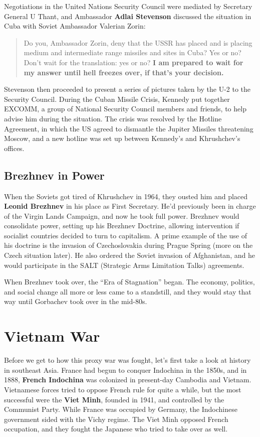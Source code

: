 Negotiations in the United Nations Security Council were mediated by Secretary General U Thant,
and Ambassador \textbf{Adlai Stevenson} discussed the situation in Cuba with Soviet Ambassador Valerian Zorin:
\begin{quote}
  Do you, Ambassador Zorin, deny that the USSR has placed
  and is placing medium and intermediate range missiles and sites in Cuba?
  Yes or no?
  Don't wait for the translation: yes or no?
  \textbf{I am prepared to wait for my answer until hell freezes over, if that's your decision.}
\end{quote}
Stevenson then proceeded to present a series of pictures taken by the U-2 to the Security Council.
During the Cuban Missile Crisis, Kennedy put together EXCOMM,
a group of National Security Council members and friends, to help advise him during the situation.
The crisis was resolved by the Hotline Agreement,
in which the US agreed to dismantle the Jupiter Missiles threatening Moscow,
and a new hotline was set up between Kennedy's and Khrushchev's offices.

\subsection*{Brezhnev in Power}

When the Soviets got tired of Khrushchev in 1964,
they ousted him and placed \textbf{Leonid Brezhnev} in his place as First Secretary.
He'd previously been in charge of the Virgin Lands Campaign, and now he took full power.
Brezhnev would consolidate power, setting up his Brezhnev Doctrine,
allowing intervention if socialist countries decided to turn to capitalism.
A prime example of the use of his doctrine is the invasion of Czechoslovakia during Prague Spring
(more on the Czech situation later).
He also ordered the Soviet invasion of Afghanistan,
and he would participate in the SALT (Strategic Arms Limitation Talks) agreements.

When Brezhnev took over, the ``Era of Stagnation'' began.
The economy, politics, and social change all more or less came to a standstill,
and they would stay that way until Gorbachev took over in the mid-80s.

\section{Vietnam War}

Before we get to how this proxy war was fought, let's first take a look at history in southeast Asia.
France had begun to conquer Indochina in the 1850s, and in 1888,
\textbf{French Indochina} was colonized in present-day Cambodia and Vietnam.
Vietnamese forces tried to oppose French rule for quite a while,
but the most successful were the \textbf{Viet Minh}, founded in 1941,
and controlled by the Communist Party.
While France was occupied by Germany, the Indochinese government sided with the Vichy regime.
The Viet Minh opposed French occupation, and they fought the Japanese who tried to take over as well.

